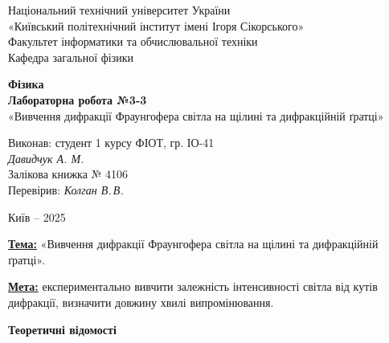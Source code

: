 \documentclass[12pt,a4paper]{article}
\begin{document}
    \begin{titlepage}

        \thispagestyle{empty}
        \begin{center}
        \large
        Національний технічний університет України\\
        «Київський політехнічний інститут імені Ігоря Сікорського»\\[1em]
        Факультет інформатики та обчислювальної техніки\\
        Кафедра загальної фізики
        \end{center}

        \vfill

        \begin{center}
        \textbf{\LARGE Фізика}\\[2em]
        \textbf{\Large Лабораторна робота №3-3}\\
        «Вивчення дифракції Фраунгофера світла на щілині та дифракційній ґратці» 
        \end{center}

        \vfill

        \begin{flushright}
        Виконав: студент 1 курсу ФІОТ, гр. ІО-41\\
        \textit{Давидчук А. М.}\\
        Залікова книжка № 4106\\[1em]
        Перевірив: \textit{Колган В.\,В.}
        \end{flushright}

        \vfill

        \begin{center}
        Київ -- 2025
        \end{center}

    \end{titlepage}

    \setlength{\parindent}{0pt}

    \textbf{\underline{Тема:}} «Вивчення дифракції Фраунгофера світла на щілині та дифракційній ґратці».

    \vspace{1em}

    \textbf{\underline{Мета:}} експериментально вивчити залежність інтенсивності світла від
    кутів дифракції, визначити довжину хвилі випромінювання.

    \vspace{1.5em}

    \begin{center} \textbf{\Large Теоретичні відомості} \end{center}
    \setlength{\parindent}{1.5em}
\end{document}
